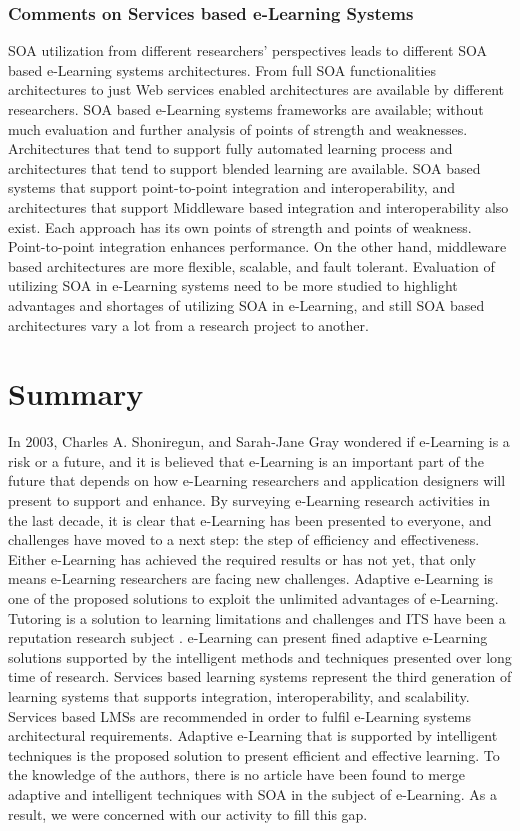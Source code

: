 \documentclass[12pt,a4paper,final,twoside,onecolumn,titlepage]{book}
\begin{document}
\subsubsection{Comments on Services based e-Learning Systems}
\gls{SOA} utilization from different researchers’ perspectives leads to different \gls{SOA} based e-Learning systems architectures. From full \gls{SOA} functionalities architectures to just Web services enabled architectures are available by different researchers. \gls{SOA} based e-Learning systems frameworks are available; without much evaluation and further analysis of points of strength and weaknesses. Architectures that tend to support fully automated learning process and architectures that tend to support blended learning are available. \gls{SOA} based systems that support point-to-point integration and interoperability, and architectures that support Middleware based integration and interoperability also exist. Each approach has its own points of strength and points of weakness. Point-to-point integration enhances performance. On the other hand, middleware based architectures are more flexible, scalable, and fault tolerant. Evaluation of utilizing \gls{SOA} in e-Learning systems need to be more studied to highlight advantages and shortages of utilizing \gls{SOA} in e-Learning, and still \gls{SOA} based architectures vary a lot from a research project to another.

\section{Summary}
In 2003, Charles A. Shoniregun, and Sarah-Jane Gray \cite{R69} wondered if e-Learning is a risk or a future, and it is believed that e-Learning is an important part of the future that depends on how e-Learning researchers and application designers will present to support and enhance. By surveying e-Learning research activities in the last decade, it is clear that e-Learning has been presented to everyone, and challenges have moved to a next step: the step of efficiency and effectiveness. Either e-Learning has achieved the required results or has not yet, that only means e-Learning researchers are facing new challenges. Adaptive e-Learning is one of the proposed solutions to exploit the unlimited advantages of e-Learning. Tutoring is a solution to learning limitations and challenges and \gls{ITS} have been a reputation research subject \cite{R70}. e-Learning can present fined adaptive e-Learning solutions supported by the intelligent methods and techniques presented over long time of research. Services based learning systems represent the third generation of learning systems that supports integration, interoperability, and scalability. Services based \gls{LMS}s are recommended in order to fulfil e-Learning systems architectural requirements. Adaptive e-Learning that is supported by intelligent techniques is the proposed solution to present efficient and effective learning. To the knowledge of the authors, there is no article have been found to merge adaptive and intelligent techniques with \gls{SOA} in the subject of e-Learning. As a result, we were concerned with our activity to fill this gap.
\end{document}
